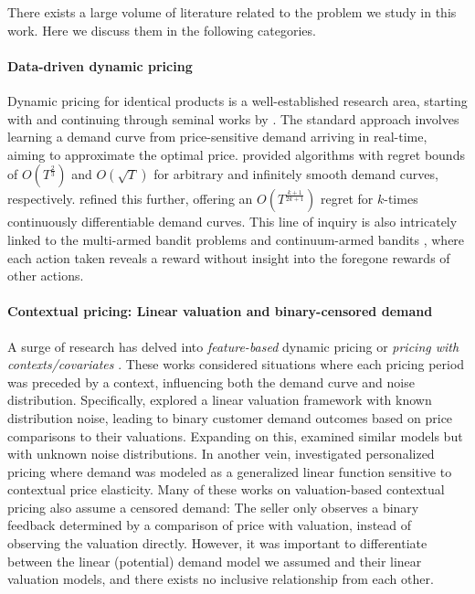 There exists a large volume of literature related to the problem we study in this work. Here we discuss them in the following categories.

\paragraph{Data-driven dynamic pricing}
Dynamic pricing for identical products is a well-established research area, starting with \citet{kleinberg2003value} and continuing through seminal works by \citet{besbes2009dynamic, broder2012dynamic, wang2014close, wang2021multimodal}. The standard approach involves learning a demand curve from price-sensitive demand arriving in real-time, aiming to approximate the optimal price. \citet{kleinberg2003value} provided algorithms with regret bounds of $O(T^{\frac23})$ and $O(\sqrt{T})$ for arbitrary and infinitely smooth demand curves, respectively. \citet{wang2021multimodal} refined this further, offering an $O(T^{\frac{k+1}{2k+1}})$ regret for $k$-times continuously differentiable demand curves. This line of inquiry is also intricately linked to the multi-armed bandit problems \citep{lai1985asymptotically, auer2002nonstochastic} and continuum-armed bandits \citep{kleinberg2004nearly}, where each action taken reveals a reward without insight into the foregone rewards of other actions.

\paragraph{Contextual pricing: Linear valuation and binary-censored demand}
A surge of research has delved into \emph{feature-based} dynamic pricing \citep{cohen2020feature_journal} or \emph{pricing with contexts/covariates} \citep{amin2014repeated, miao2019context, liu2021optimal}.  These works considered situations where each pricing period was preceded by a context, influencing both the demand curve and noise distribution. Specifically, \citet{cohen2020feature_journal, javanmard2019dynamic, xu2021logarithmic} explored a linear valuation framework with known distribution noise, leading to binary customer demand outcomes based on price comparisons to their valuations. Expanding on this, \citet{golrezaei2019incentive, fan2021policy, luo2021distribution, xu2022towards} examined similar models but with unknown noise distributions. In another vein, \citet{ban2021personalized, wang2021dynamic, xu2024pricing} investigated personalized pricing where demand was modeled as a generalized linear function sensitive to contextual price elasticity. Many of these works on valuation-based contextual pricing also assume a censored demand: The seller only observes a binary feedback determined by a comparison of price with valuation, instead of observing the valuation directly. However, it was important to differentiate between the linear (potential) demand model we assumed and their linear valuation models, and there exists no inclusive relationship from each other. 

